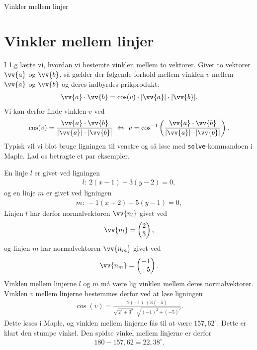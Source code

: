 \begin{center}
\Huge
Vinkler mellem linjer
\end{center}

\section*{Vinkler mellem linjer}


I 1.g lærte vi, hvordan vi bestemte vinklen mellem to vektorer. Givet to vektorer $\vv{a}$ og $\vv{b}$, så gælder der følgende forhold mellem vinklen $v$ mellem $\vv{a}$ og $\vv{b}$ og deres indbyrdes prikprodukt:
\begin{align*}
	\vv{a}\cdot \vv{b} = \cos(v)\cdot |\vv{a}|\cdot |\vv{b}|.
\end{align*}
Vi kan derfor finde vinklen $v$ ved 
\begin{align*}
	\cos(v) = \frac{\vv{a}\cdot \vv{b}}{|\vv{a}|\cdot |\vv{b}|} \ \Leftrightarrow \ v
	= \cos^{-1}\left(\frac{\vv{a}\cdot \vv{b}}{|\vv{a}|\cdot |\vv{b}|}\right).
\end{align*}
Typisk vil vi blot bruge ligningen til venstre og så løse med \texttt{solve}-kommandoen i Maple. 
Lad os betragte et par eksempler.
\begin{exa}
	En linje $l$ er givet ved ligningen
	\begin{align*}
		l: \ 2(x-1) + 3(y-2) = 0,
	\end{align*}
	og en linje $m$ er givet ved ligningen
	\begin{align*}
		m: \ -1(x+2) -5(y-1) = 0,
	\end{align*}
	Linjen $l$ har derfor normalvektoren $\vv{n_l}$ givet ved
	\begin{align*}
		\vv{n_l} = \begin{pmatrix}
			2 \\ 3	
		\end{pmatrix},
	\end{align*}
	og linjen $m$ har normalvektoren $\vv{n_m}$ givet ved
	\begin{align*}
		\vv{n_m} = \begin{pmatrix}
			-1\\-5
		\end{pmatrix}.
	\end{align*}
	Vinklen mellem linjerne $l$ og $m$ må være lig vinklen mellem deres normalvektorer. 
	Vinklen $v$ mellem linjerne bestemmes derfor ved at løse ligningen
	\begin{align*}
		\cos(v) = \frac{2(-1)+3(-5)}{\sqrt{2^2+3^2}\cdot\sqrt{(-1)^2+(-5)^2}}. 
	\end{align*}
	Dette løses i Maple, og vinklen mellem linjerne fås til at være $157,62^{\circ}$. Dette er 
	klart den stumpe vinkel. Den spidse vinkel mellem linjerne er derfor 
	\begin{align*}
		180-157,62 = 22,38^{\circ}.
	\end{align*}
\end{exa}
